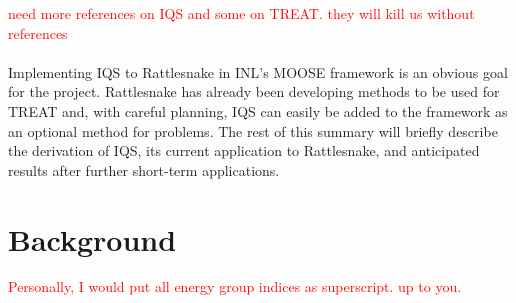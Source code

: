 \documentclass[11pt]{scrartcl}
\newcommand{\tcr}[1]{\textcolor{red}{#1}}
\begin{document}
\tcr{need more references on IQS and some on TREAT. they will kill us without references}
\\ \\
Implementing IQS to Rattlesnake in INL's MOOSE framework is an obvious goal for the project.  Rattlesnake has already been developing methods to be used for TREAT and, with careful planning, IQS can easily be added to the framework as an optional method for problems.  The rest of this summary will briefly describe the derivation of IQS, its current application to Rattlesnake, and anticipated results after further short-term applications.

\section{Background}

\tcr{Personally, I would put all energy group indices as superscript. up to you.\\}
\end{document}
